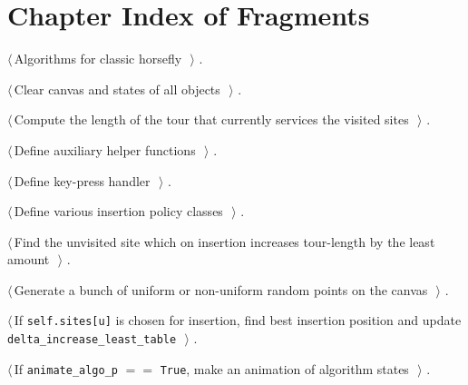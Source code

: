 \documentclass[11.5pt]{report}
\begin{document}
\section{Chapter Index of Fragments}

{\small\begin{list}{}{\setlength{\itemsep}{-\parsep}\setlength{\itemindent}{-\leftmargin}}
\item $\langle\,$Algorithms for classic horsefly\nobreak\ {\footnotesize {}}$\,\rangle$ {\footnotesize {\NWtxtRefIn} .}
\item $\langle\,$Clear canvas and states of all objects\nobreak\ {\footnotesize {}}$\,\rangle$ {\footnotesize {\NWtxtRefIn} .}
\item $\langle\,$Compute the length of the tour that currently services the visited sites\nobreak\ {\footnotesize {}}$\,\rangle$ {\footnotesize {\NWtxtRefIn} .}
\item $\langle\,$Define auxiliary helper functions\nobreak\ {\footnotesize {}}$\,\rangle$ {\footnotesize {\NWtxtRefIn} .}
\item $\langle\,$Define key-press handler\nobreak\ {\footnotesize {}}$\,\rangle$ {\footnotesize {\NWtxtRefIn} .}
\item $\langle\,$Define various insertion policy classes\nobreak\ {\footnotesize {}}$\,\rangle$ {\footnotesize {\NWtxtRefIn} .}
\item $\langle\,$Find the unvisited site which on insertion increases tour-length by the least amount\nobreak\ {\footnotesize {}}$\,\rangle$ {\footnotesize {\NWtxtRefIn} .}
\item $\langle\,$Generate a bunch of uniform or non-uniform random points on the canvas\nobreak\ {\footnotesize {}}$\,\rangle$ {\footnotesize {\NWtxtRefIn} .}
\item $\langle\,$If \texttt{self.sites[u]} is chosen for insertion, find best insertion position and update \texttt{delta\_increase\_least\_table}\nobreak\ {\footnotesize {}}$\,\rangle$ {\footnotesize {\NWtxtRefIn} .}
\item $\langle\,$If \verb|animate_algo_p| $==$ \verb|True|, make an animation of algorithm states\nobreak\ {\footnotesize {}}$\,\rangle$ {\footnotesize {\NWtxtRefIn} .}

\end{list}}
\end{document}
